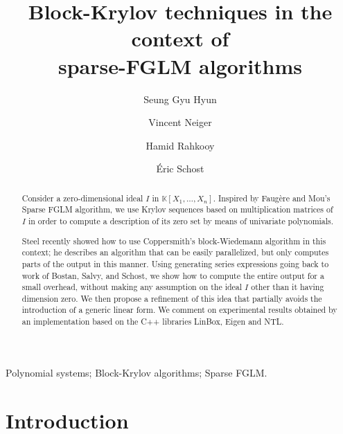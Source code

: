 \documentclass[final,1p,times,authoryear]{elsarticle}
\def\K{\mathbb{K}}
\def\K {\ensuremath{\mathbb{K}}}
\begin{document}
\begin{frontmatter}

  \title{Block-Krylov techniques in the context of \\ sparse-FGLM algorithms}

  \author{Seung Gyu Hyun}
  \address{Cheriton School of Computer Science, University of Waterloo}

  \author{Vincent Neiger}
  \address{Univ.~Limoges, CNRS, XLIM, UMR 7252, F-87000 Limoges, France}

  \author{Hamid Rahkooy}
  \address{Cheriton School of Computer Science, University of Waterloo}

  \author{\'Eric Schost}
  \address{Cheriton School of Computer Science, University of Waterloo}

  \begin{abstract}
    Consider a zero-dimensional ideal $I$ in $\K[X_1,\dots,X_n]$.  Inspired by
    Faug\`ere and Mou's Sparse FGLM algorithm,
    we use Krylov sequences based on multiplication matrices of $I$ in order to
    compute a description of its zero set by means of univariate polynomials.

    Steel recently showed how to use Coppersmith's block-Wiedemann algorithm in
    this context; he describes an algorithm that can be easily parallelized, but
    only computes parts of the output in this manner. Using generating series
    expressions going back to work of Bostan, Salvy, and Schost, we show how to
    compute the entire output for a small overhead, without making any assumption
    on the ideal $I$ other than it having dimension zero. We then propose a refinement of this idea that partially
    avoids the introduction of a generic linear form.  We comment on experimental
    results obtained by an implementation based on the C++ libraries LinBox, Eigen and
    NTL.
  \end{abstract}

  \begin{keyword}
    Polynomial systems; Block-Krylov algorithms; Sparse FGLM.
  \end{keyword}

\end{frontmatter}


\section{Introduction}
\end{document}
